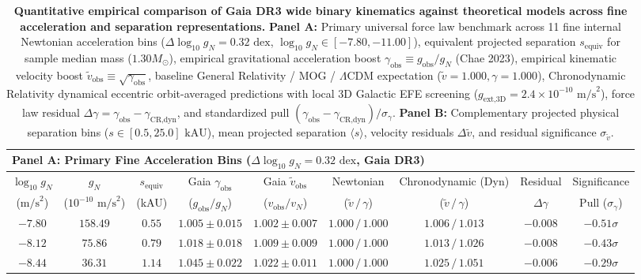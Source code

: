\documentclass[aps,prd,reprint,superscriptaddress,nofootinbib,floatfix,amsmath,amssymb]{revtex4-2}
\begin{document}
\begin{table}[t]
\caption{\textbf{Quantitative empirical comparison of Gaia DR3 wide binary kinematics against theoretical models across fine acceleration and separation representations.} 
\textbf{Panel A:} Primary universal force law benchmark across 11 fine internal Newtonian acceleration bins ($\Delta\log_{10} g_N = 0.32\text{ dex}$, $\log_{10} g_N \in [-7.80, -11.00]$), equivalent projected separation $s_{\text{equiv}}$ for sample median mass ($1.30 M_\odot$), empirical gravitational acceleration boost $\gamma_{\text{obs}} \equiv g_{\text{obs}} / g_N$ (Chae 2023), empirical kinematic velocity boost $\tilde{v}_{\text{obs}} \equiv \sqrt{\gamma_{\text{obs}}}$, baseline General Relativity / MOG / $\Lambda$CDM expectation ($\tilde{v} = 1.000, \gamma = 1.000$), Chronodynamic Relativity dynamical eccentric orbit-averaged predictions with local 3D Galactic EFE screening ($g_{\text{ext,3D}} = 2.4 \times 10^{-10}\text{ m/s}^2$), force law residual $\Delta\gamma = \gamma_{\text{obs}} - \gamma_{\text{CR,dyn}}$, and standardized pull $(\gamma_{\text{obs}} - \gamma_{\text{CR,dyn}}) / \sigma_\gamma$.
\textbf{Panel B:} Complementary projected physical separation bins ($s \in [0.5, 25.0]\text{ kAU}$), mean projected separation $\langle s \rangle$, velocity residuals $\Delta\tilde{v}$, and residual significance $\sigma_{\tilde{v}}$.}
\label{tab:wide_binaries}
\begin{ruledtabular}
\footnotesize
\setlength{\tabcolsep}{2.5pt}
\begin{tabular}{ccccccccc}
\multicolumn{9}{l}{\textbf{Panel A: Primary Fine Acceleration Bins ($\Delta\log_{10} g_N = 0.32\text{ dex}$, Gaia DR3)}} \\
\hline
$\log_{10} g_N$ & $g_N$ & $s_{\text{equiv}}$ & Gaia $\gamma_{\text{obs}}$ & Gaia $\tilde{v}_{\text{obs}}$ & Newtonian & Chronodynamic (Dyn) & Residual & Significance \\
($\text{m/s}^2$) & ($10^{-10}\text{ m/s}^2$) & (kAU) & ($g_{\text{obs}} / g_N$) & ($v_{\text{obs}} / v_N$) & ($\tilde{v} \,/\, \gamma$) & ($\tilde{v} \,/\, \gamma$) & $\Delta\gamma$ & Pull ($\sigma_\gamma$) \\
\hline
$-7.80$ & $158.49$ & $0.55$ & $1.005 \pm 0.015$ & $1.002 \pm 0.007$ & $1.000 \,/\, 1.000$ & $1.006 \,/\, 1.013$ & $-0.008$ & $-0.51\sigma$ \\
$-8.12$ & $75.86$  & $0.79$ & $1.018 \pm 0.018$ & $1.009 \pm 0.009$ & $1.000 \,/\, 1.000$ & $1.013 \,/\, 1.026$ & $-0.008$ & $-0.43\sigma$ \\
$-8.44$ & $36.31$  & $1.14$ & $1.045 \pm 0.022$ & $1.022 \pm 0.011$ & $1.000 \,/\, 1.000$ & $1.025 \,/\, 1.051$ & $-0.006$ & $-0.29\sigma$ \\

\end{tabular}
\end{ruledtabular}
\end{table}
\end{document}
